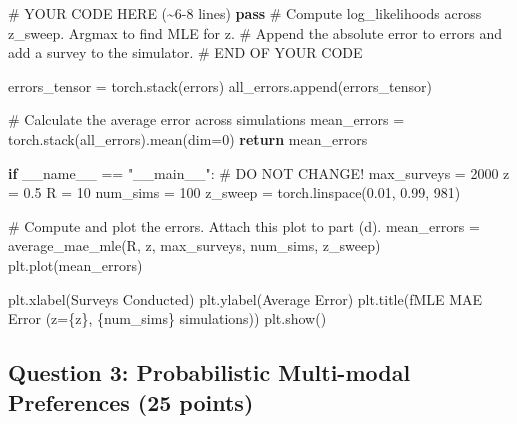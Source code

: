 \documentclass[
  letterpaper,
  numbers=noenddot,
  DIV=11,
  oneside]{scrreprt}
\newenvironment{Shaded}{\begin{snugshade}}{\end{snugshade}}
\newcommand{\CommentTok}[1]{\textcolor[rgb]{0.37,0.37,0.37}{#1}}
\newcommand{\ControlFlowTok}[1]{\textcolor[rgb]{0.00,0.23,0.31}{\textbf{#1}}}
\newcommand{\DecValTok}[1]{\textcolor[rgb]{0.68,0.00,0.00}{#1}}
\newcommand{\FloatTok}[1]{\textcolor[rgb]{0.68,0.00,0.00}{#1}}
\newcommand{\NormalTok}[1]{\textcolor[rgb]{0.00,0.23,0.31}{#1}}
\newcommand{\OperatorTok}[1]{\textcolor[rgb]{0.37,0.37,0.37}{#1}}
\newcommand{\RegionMarkerTok}[1]{\textcolor[rgb]{0.00,0.23,0.31}{#1}}
\newcommand{\SpecialCharTok}[1]{\textcolor[rgb]{0.37,0.37,0.37}{#1}}
\newcommand{\SpecialStringTok}[1]{\textcolor[rgb]{0.13,0.47,0.30}{#1}}
\newcommand{\StringTok}[1]{\textcolor[rgb]{0.13,0.47,0.30}{#1}}
\newcommand{\VariableTok}[1]{\textcolor[rgb]{0.07,0.07,0.07}{#1}}
\theoremstyle{remark}
\begin{document}
\begin{Shaded}
\begin{Highlighting}[numbers=left,,]
            \CommentTok{\# YOUR CODE HERE (\textasciitilde{}6{-}8 lines)}
            \ControlFlowTok{pass} \CommentTok{\# Compute log\_likelihoods across z\_sweep. Argmax to find MLE for z. }
                 \CommentTok{\# Append the absolute error to errors and add a survey to the simulator.}
            \CommentTok{\# }\RegionMarkerTok{END}\CommentTok{ OF YOUR CODE}

\NormalTok{        errors\_tensor }\OperatorTok{=}\NormalTok{ torch.stack(errors) }
\NormalTok{        all\_errors.append(errors\_tensor)}

    \CommentTok{\# Calculate the average error across simulations }
\NormalTok{    mean\_errors }\OperatorTok{=}\NormalTok{ torch.stack(all\_errors).mean(dim}\OperatorTok{=}\DecValTok{0}\NormalTok{)}
    \ControlFlowTok{return}\NormalTok{ mean\_errors}

\ControlFlowTok{if} \VariableTok{\_\_name\_\_} \OperatorTok{==} \StringTok{"\_\_main\_\_"}\NormalTok{:}
    \CommentTok{\# DO NOT CHANGE!}
\NormalTok{    max\_surveys }\OperatorTok{=} \DecValTok{2000}
\NormalTok{    z }\OperatorTok{=} \FloatTok{0.5}
\NormalTok{    R }\OperatorTok{=} \DecValTok{10}
\NormalTok{    num\_sims }\OperatorTok{=} \DecValTok{100}
\NormalTok{    z\_sweep }\OperatorTok{=}\NormalTok{ torch.linspace(}\FloatTok{0.01}\NormalTok{, }\FloatTok{0.99}\NormalTok{, }\DecValTok{981}\NormalTok{)}

    \CommentTok{\# Compute and plot the errors. Attach this plot to part (d).}
\NormalTok{    mean\_errors }\OperatorTok{=}\NormalTok{ average\_mae\_mle(R, z, max\_surveys, num\_sims, z\_sweep)}
\NormalTok{    plt.plot(mean\_errors)}

\NormalTok{    plt.xlabel(}\StringTok{\textquotesingle{}Surveys Conducted\textquotesingle{}}\NormalTok{)}
\NormalTok{    plt.ylabel(}\StringTok{\textquotesingle{}Average Error\textquotesingle{}}\NormalTok{)}
\NormalTok{    plt.title(}\SpecialStringTok{f\textquotesingle{}MLE MAE Error (z=}\SpecialCharTok{\{}\NormalTok{z}\SpecialCharTok{\}}\SpecialStringTok{, }\SpecialCharTok{\{}\NormalTok{num\_sims}\SpecialCharTok{\}}\SpecialStringTok{ simulations)\textquotesingle{}}\NormalTok{)}
\NormalTok{    plt.show()}
\end{Highlighting}
\end{Shaded}

\subsection*{Question 3: Probabilistic Multi-modal Preferences (25
points)}\label{question-3-probabilistic-multi-modal-preferences-25-points}
\end{document}
